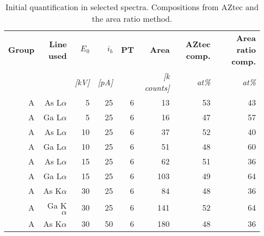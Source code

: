 \begin{table}[phtb]
    \begin{center}
        \caption{
            Initial quantification in selected spectra.
            Compositions from AZtec and the area ratio method.
        }
        \label{tab:results:initial_quantification}
        \begin{tabular}{rrrrrrrr}
            \hline
            \textbf{ Group} & \textbf{Line used} & \textbf{$E_0$} & \textbf{$i_b$} & \textbf{PT} & \textbf{Area}     & \textbf{AZtec comp.} & \textbf{Area ratio comp.} \\
            \emph{}         & \emph{}            & \emph{[kV]}    & \emph{[pA]}    & \emph{}     & \emph{[k counts]} & \emph{at\%}          & \emph{at\%}               \\
            \hline
            A               & As L$\alpha$       & 5              & 25             & 6           & 13                & 53                   & 43                        \\
            A               & Ga L$\alpha$       & 5              & 25             & 6           & 16                & 47                   & 57                        \\
            A               & As L$\alpha$       & 10             & 25             & 6           & 37                & 52                   & 40                        \\
            A               & Ga L$\alpha$       & 10             & 25             & 6           & 51                & 48                   & 60                        \\
            A               & As L$\alpha$       & 15             & 25             & 6           & 62                & 51                   & 36                        \\
            A               & Ga L$\alpha$       & 15             & 25             & 6           & 103               & 49                   & 64                        \\
            A               & As K$\alpha$       & 30             & 25             & 6           & 84                & 48                   & 36                        \\
            A               & Ga K$\alpha$       & 30             & 25             & 6           & 141               & 52                   & 64                        \\
            A               & As K$\alpha$       & 30             & 50             & 6           & 180               & 48                   & 36                        \\

\end{tabular}
\end{center}
\end{table}
